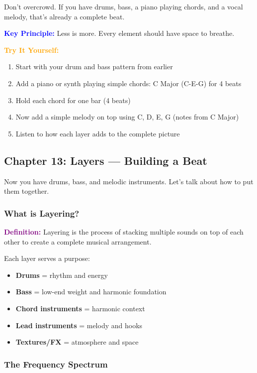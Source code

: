 \documentclass[11pt,letterpaper]{article}
\newcommand{\purple}[1]{\textcolor{purple}{\textbf{#1}}}
\newcommand{\bluepurple}[1]{\textcolor{blue}{\textbf{#1}}}
\newcommand{\orangetext}[1]{\textcolor{orange}{\textbf{#1}}}
\begin{document}
Don't overcrowd. If you have drums, bass, a piano playing chords, and a vocal melody, that's already a complete beat.

\textbf{\bluepurple{Key Principle:}} Less is more. Every element should have space to breathe.

\textbf{\orangetext{Try It Yourself:}}

\begin{enumerate}[leftmargin=*]
\item Start with your drum and bass pattern from earlier
\item Add a piano or synth playing simple chords: C Major (C-E-G) for 4 beats
\item Hold each chord for one bar (4 beats)
\item Now add a simple melody on top using C, D, E, G (notes from C Major)
\item Listen to how each layer adds to the complete picture
\end{enumerate}

\newpage

\subsection{Chapter 13: Layers — Building a Beat}

Now you have drums, bass, and melodic instruments. Let's talk about how to put them together.

\subsubsection{What is Layering?}

\textbf{\purple{Definition:}} Layering is the process of stacking multiple sounds on top of each other to create a complete musical arrangement.

Each layer serves a purpose:
\begin{itemize}[leftmargin=*]
\item \textbf{Drums} = rhythm and energy
\item \textbf{Bass} = low-end weight and harmonic foundation
\item \textbf{Chord instruments} = harmonic context
\item \textbf{Lead instruments} = melody and hooks
\item \textbf{Textures/FX} = atmosphere and space
\end{itemize}

\subsubsection{The Frequency Spectrum}
\end{document}
